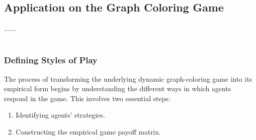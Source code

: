\subsection{Application on the Graph Coloring Game}

\begin{flushleft}

    ......\\~\\

    \subsubsection{Defining Styles of Play}
    \label{sec:5.1}

    \begin{flushleft}

        The process of transforming the underlying dynamic graph-coloring game into its empirical form begins by understanding the different ways in which agents respond in the game. This involves two essential steps:
        \begin{enumerate}
            \item Identifying agents' strategies.
            \item Constructing the empirical game payoff matrix.\\~\\
        \end{enumerate}


\end{flushleft}
\end{flushleft}
